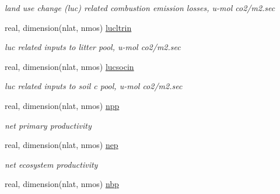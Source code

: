 \begin{DoxyCompactItemize}
\begin{DoxyCompactList}\small\item\em land use change (luc) related combustion emission losses, u-\/mol co2/m2.\+sec \end{DoxyCompactList}\item 
\hypertarget{structctem__statevars_1_1veg__rot_ad6b7cab2f6af48ae399dee3e722eab6b}{}real, dimension(nlat, nmos) \hyperlink{structctem__statevars_1_1veg__rot_ad6b7cab2f6af48ae399dee3e722eab6b}{lucltrin}\label{structctem__statevars_1_1veg__rot_ad6b7cab2f6af48ae399dee3e722eab6b}

\begin{DoxyCompactList}\small\item\em luc related inputs to litter pool, u-\/mol co2/m2.\+sec \end{DoxyCompactList}\item 
\hypertarget{structctem__statevars_1_1veg__rot_a3607609cc4766b58b177306d4130c849}{}real, dimension(nlat, nmos) \hyperlink{structctem__statevars_1_1veg__rot_a3607609cc4766b58b177306d4130c849}{lucsocin}\label{structctem__statevars_1_1veg__rot_a3607609cc4766b58b177306d4130c849}

\begin{DoxyCompactList}\small\item\em luc related inputs to soil c pool, u-\/mol co2/m2.\+sec \end{DoxyCompactList}\item 
\hypertarget{structctem__statevars_1_1veg__rot_a25b7905aae5d130f67504f5299b3a207}{}real, dimension(nlat, nmos) \hyperlink{structctem__statevars_1_1veg__rot_a25b7905aae5d130f67504f5299b3a207}{npp}\label{structctem__statevars_1_1veg__rot_a25b7905aae5d130f67504f5299b3a207}

\begin{DoxyCompactList}\small\item\em net primary productivity \end{DoxyCompactList}\item 
\hypertarget{structctem__statevars_1_1veg__rot_a41749e18889a236c3e0874501f4e33ca}{}real, dimension(nlat, nmos) \hyperlink{structctem__statevars_1_1veg__rot_a41749e18889a236c3e0874501f4e33ca}{nep}\label{structctem__statevars_1_1veg__rot_a41749e18889a236c3e0874501f4e33ca}

\begin{DoxyCompactList}\small\item\em net ecosystem productivity \end{DoxyCompactList}\item 
\hypertarget{structctem__statevars_1_1veg__rot_a3965257554aa3a622c02f729e103a001}{}real, dimension(nlat, nmos) \hyperlink{structctem__statevars_1_1veg__rot_a3965257554aa3a622c02f729e103a001}{nbp}\label{structctem__statevars_1_1veg__rot_a3965257554aa3a622c02f729e103a001}


\end{DoxyCompactItemize}
